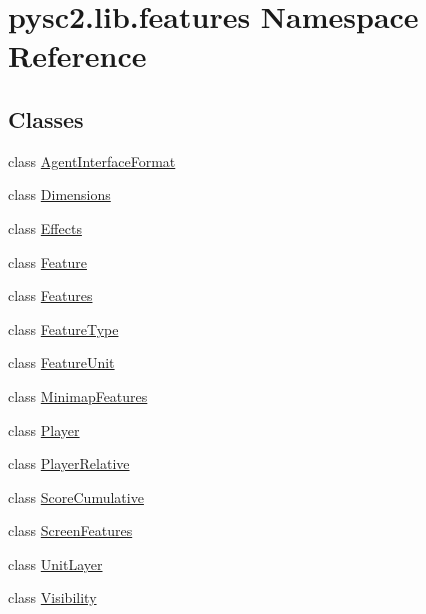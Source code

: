\hypertarget{namespacepysc2_1_1lib_1_1features}{}\section{pysc2.\+lib.\+features Namespace Reference}
\label{namespacepysc2_1_1lib_1_1features}
\subsection*{Classes}
\begin{DoxyCompactItemize}
\item 
class \mbox{\hyperlink{classpysc2_1_1lib_1_1features_1_1_agent_interface_format}{Agent\+Interface\+Format}}
\item 
class \mbox{\hyperlink{classpysc2_1_1lib_1_1features_1_1_dimensions}{Dimensions}}
\item 
class \mbox{\hyperlink{classpysc2_1_1lib_1_1features_1_1_effects}{Effects}}
\item 
class \mbox{\hyperlink{classpysc2_1_1lib_1_1features_1_1_feature}{Feature}}
\item 
class \mbox{\hyperlink{classpysc2_1_1lib_1_1features_1_1_features}{Features}}
\item 
class \mbox{\hyperlink{classpysc2_1_1lib_1_1features_1_1_feature_type}{Feature\+Type}}
\item 
class \mbox{\hyperlink{classpysc2_1_1lib_1_1features_1_1_feature_unit}{Feature\+Unit}}
\item 
class \mbox{\hyperlink{classpysc2_1_1lib_1_1features_1_1_minimap_features}{Minimap\+Features}}
\item 
class \mbox{\hyperlink{classpysc2_1_1lib_1_1features_1_1_player}{Player}}
\item 
class \mbox{\hyperlink{classpysc2_1_1lib_1_1features_1_1_player_relative}{Player\+Relative}}
\item 
class \mbox{\hyperlink{classpysc2_1_1lib_1_1features_1_1_score_cumulative}{Score\+Cumulative}}
\item 
class \mbox{\hyperlink{classpysc2_1_1lib_1_1features_1_1_screen_features}{Screen\+Features}}
\item 
class \mbox{\hyperlink{classpysc2_1_1lib_1_1features_1_1_unit_layer}{Unit\+Layer}}
\item 
class \mbox{\hyperlink{classpysc2_1_1lib_1_1features_1_1_visibility}{Visibility}}
\end{DoxyCompactItemize}
